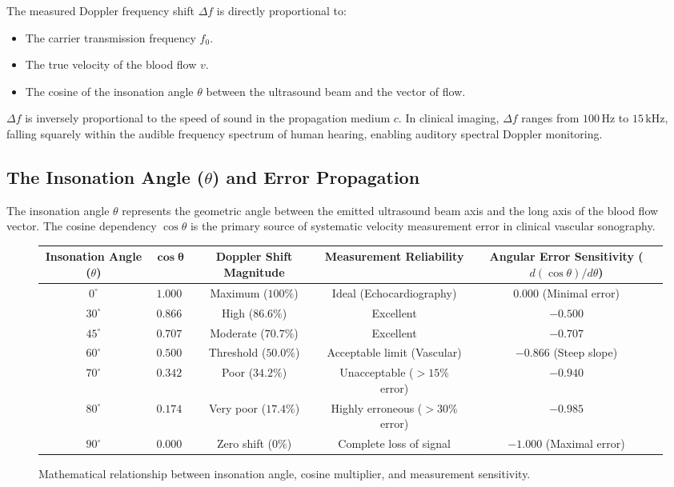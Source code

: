 \documentclass[11pt,a4paper]{article}
\begin{document}
\begin{hemodynamics}
The measured Doppler frequency shift $\Delta f$ is directly proportional to:
\begin{itemize}[leftmargin=*]
    \item The carrier transmission frequency $f_0$.
    \item The true velocity of the blood flow $v$.
    \item The cosine of the insonation angle $\theta$ between the ultrasound beam and the vector of flow.
\end{itemize}
$\Delta f$ is inversely proportional to the speed of sound in the propagation medium $c$. In clinical imaging, $\Delta f$ ranges from $100\,\text{Hz}$ to $15\,\text{kHz}$, falling squarely within the audible frequency spectrum of human hearing, enabling auditory spectral Doppler monitoring.
\end{hemodynamics}

\subsection{The Insonation Angle ($\theta$) and Error Propagation}

The insonation angle $\theta$ represents the geometric angle between the emitted ultrasound beam axis and the long axis of the blood flow vector. The cosine dependency $\cos\theta$ is the primary source of systematic velocity measurement error in clinical vascular sonography.

\begin{figure}[htbp]
\centering
\begin{tabular}{ccccc}
\toprule
\textbf{Insonation Angle ($\theta$)} & $\boldsymbol{\cos\theta}$ & \textbf{Doppler Shift Magnitude} & \textbf{Measurement Reliability} & \textbf{Angular Error Sensitivity ($d(\cos\theta)/d\theta$)} \\
\midrule
$0^\circ$ & $1.000$ & Maximum ($100\%$) & Ideal (Echocardiography) & $0.000$ (Minimal error) \\
$30^\circ$ & $0.866$ & High ($86.6\%$) & Excellent & $-0.500$ \\
$45^\circ$ & $0.707$ & Moderate ($70.7\%$) & Excellent & $-0.707$ \\
$60^\circ$ & $0.500$ & Threshold ($50.0\%$) & Acceptable limit (Vascular) & $-0.866$ (Steep slope) \\
$70^\circ$ & $0.342$ & Poor ($34.2\%$) & Unacceptable ($>15\%$ error) & $-0.940$ \\
$80^\circ$ & $0.174$ & Very poor ($17.4\%$) & Highly erroneous ($>30\%$ error) & $-0.985$ \\
$90^\circ$ & $0.000$ & Zero shift ($0\%$) & Complete loss of signal & $-1.000$ (Maximal error) \\
\bottomrule
\end{tabular}
\caption{Mathematical relationship between insonation angle, cosine multiplier, and measurement sensitivity.}
\label{tab:doppler_angle}
\end{figure}
\end{document}
